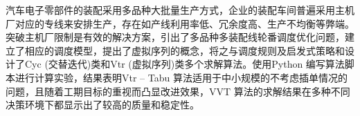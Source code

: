 ﻿%
汽车电子零部件的装配采用多品种大批量生产方式，企业的装配车间普遍采用主机厂对应的专线来安排生产，存在如产线利用率低、冗余度高、生产不均衡等弊端。突破主机厂限制是有效的解决方案，引出了多品种多装配线轮番调度优化问题，建立了相应的调度模型，提出了虚拟序列的概念，将之与调度规则及启发式策略和设计了Cyc (交替迭代)类和Vtr (虚拟序列)类多个求解算法。使用Python 编写算法脚本进行计算实验，结果表明Vtr -- Tabu 算法适用于中小规模的不考虑插单情况的问题，且随着工期目标的重视而凸显改进效果，VVT 算法的求解结果在多种不同决策环境下都显示出了较高的质量和稳定性。

